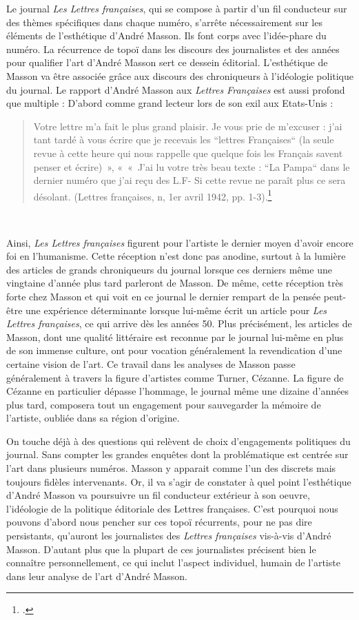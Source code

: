 Le journal \emph{Les Lettres françaises}, qui se compose à partir d’un fil conducteur sur des thèmes spécifiques dans chaque numéro, s’arrête nécessairement sur les éléments de l’esthétique d’André Masson.  Ils font corps avec l’idée-phare du numéro.  La récurrence de topoï dans les discours des journalistes et des années pour qualifier l’art d’André Masson sert ce dessein éditorial. L’esthétique de Masson va être associée grâce aux discours des chroniqueurs à l’idéologie politique du journal. Le rapport d’André Masson aux \emph{Lettres Françaises} est aussi profond que multiple : D’abord comme grand lecteur lors de son exil aux Etats-Unis : 

\begin{quote}
Votre lettre m’a fait le plus grand plaisir. Je vous prie de m’excuser : j’ai tant tardé à vous écrire que je recevais les “lettres Françaises“ (la seule revue à cette heure qui nous rappelle que quelque fois les Français savent penser et écrire) », « « J’ai lu votre très beau texte : “La Pampa“ dans le dernier numéro que j’ai reçu des L.F- Si cette revue ne paraît plus ce sera désolant. (Lettres françaises, n, 1er avril 1942, pp. 1-3).\footcite[p478]{anneessurrealistes}
\end{quote}
 

	Ainsi, \emph{Les Lettres françaises }figurent pour l’artiste le dernier moyen d’avoir encore foi en l’humanisme. Cette réception n’est donc pas anodine, surtout à la lumière des articles de grands chroniqueurs du journal lorsque ces derniers même une vingtaine d’année plus tard parleront de Masson. De même, cette réception très forte chez Masson et qui voit en ce journal le dernier rempart de la pensée peut-être une expérience déterminante lorsque lui-même écrit un article pour \emph{Les Lettres françaises}, ce qui arrive dès les années 50. Plus précisément, les articles de Masson, dont une qualité littéraire est reconnue par le journal lui-même en plus de son immense culture, ont pour vocation généralement la revendication d’une certaine vision de l’art. Ce travail dans les analyses de Masson passe généralement à travers la figure d’artistes comme Turner, Cézanne. La figure de Cézanne en particulier dépasse l’hommage, le journal même une dizaine d’années plus tard, composera tout un engagement pour sauvegarder la mémoire de l’artiste, oubliée dans sa région d’origine. 

On touche déjà à des questions qui relèvent de choix d’engagements politiques du journal. Sans compter les grandes enquêtes dont la problématique est centrée sur l’art dans plusieurs numéros. Masson y apparait comme l’un des discrets mais toujours fidèles intervenants. Or, il va s’agir de constater à quel point l’esthétique d’André Masson va poursuivre un fil conducteur extérieur à son oeuvre, l’idéologie de la politique éditoriale des Lettres françaises. C’est pourquoi nous pouvons d’abord nous pencher sur ces topoï récurrents, pour ne pas dire persistants, qu’auront les journalistes des \emph{Lettres françaises} vis-à-vis d’André Masson. D’autant plus que la plupart de ces journalistes précisent bien le connaître personnellement, ce qui inclut l’aspect individuel, humain de l’artiste dans leur analyse de l’art d’André Masson. 


